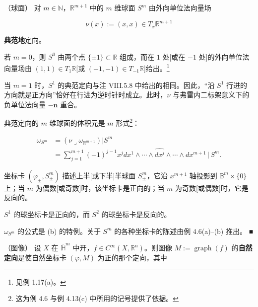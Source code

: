 \begin{example}
\begin{items}
\item[（c）]

（球面） 对 $ m \in \mathbb{N} $，$ \mathbb{R}^{m+1} $ 中的 $ m $ 维球面 $ S^m $ 由外向单位法向量场

\[
\nu(x) := (x, x) \in T_x\mathbb{R}^{m+1}
\]

\textbf{典范地}定向。

\end{items}


若 $ m = 0 $，则 $ S^0 $ 由两个点 $ \{\pm 1\} \subset \mathbb{R} $ 组成，而在 $ 1 $ 处[或在 $ -1 $ 处]的外向单位法向量场由 $ (1,1) \in T_1\mathbb{R} $[或 $ (-1,-1) \in T_{-1}\mathbb{R} $]给出。\footnote{见例 1.17(a)。}

当 $ m = 1 $ 时，$ S^1 $ 的典范定向与注 VIII.5.8 中给出的相同。因此，“沿 $ S^1 $ 行进的方向就是正方向”恰好在行进为逆时针时成立。此时，$ \nu $ 与弗雷内二标架意义下的负单位法向量 $ -\mathbf{n} $ 重合。

典范定向的 $ m $ 维球面的体积元是 $ m $ 形式\footnote{这为例 4.6 与例 4.13(c) 中所用的记号提供了依据。}：

\begin{equation*}
\begin{aligned}
\omega_{S^m} &= (\nu \lrcorner \omega_{\mathbb{R}^{m+1}})|S^m \\ &= \sum_{j=1}^{m+1} (-1)^{j-1} x^j dx^1 \wedge \cdots \wedge \widehat{dx^j} \wedge \cdots \wedge dx^{m+1} \,|\, S^m .
\end{aligned}
\end{equation*}

坐标卡 $ (\varphi_{\pm}, S_{\pm}^m) $ 描述上半[或下半]半球面 $ S_{\pm}^m $，它沿 $ x^{m+1} $ 轴投影到 $ \mathbb{B}^m \times \{0\} $ 上；当 $ m $ 为偶数[或奇数]时，该坐标卡是正向的；当 $ m $ 为奇数[或偶数]时，它是反向的。

$ S^1 $ 的球坐标卡是正向的，而 $ S^2 $ 的球坐标卡是反向的。

\proofhead
$ \omega_{S^m} $ 的公式是 (b) 的特例。关于 $ S^m $ 的各种坐标卡的陈述由例 4.6(a)–(b) 推出。 \nobreak\hspace{0.35em}■

\begin{items}
\item[（d）]

（图像） 设 $ X $ 在 $ \overline{\mathbb{H}}^m $ 中开，$ f \in C^\infty(X, \mathbb{R}^n) $。则图像 $ M := \operatorname{graph}(f) $ 的\textbf{自然定向}是使自然坐标卡 $ (\varphi, M) $ 为正的那个定向，其中


\end{items}
\end{example}
